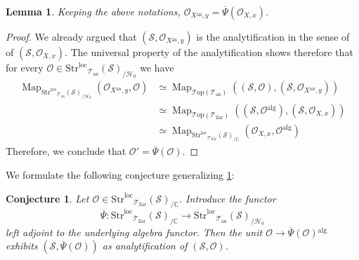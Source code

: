 \documentclass[12pt,a4paper,reqno]{amsart}
\theoremstyle{plain}
\newtheorem{lem}[thm]{Lemma}
\newtheorem{conj}[thm]{Conjecture}
\theoremstyle{definition}
\theoremstyle{remark}
\numberwithin{equation}{section}
\begin{document}
\begin{lem} \label{lem:Psi_computes_absolute_analytification}
	Keeping the above notations, ${\mathcal O}_{X{^\mathrm{an}}, y} = \overline{\Psi}({\mathcal O}_{X,x})$.
\end{lem}

\begin{proof}
	We already argued that $({\mathcal S}, {\mathcal O}_{X{^\mathrm{an}}, y})$ is the analytification in the sense of \cite{DAG-IX} of $({\mathcal S}, {\mathcal O}_{X,x})$.
	The universal property of the analytification shows therefore that for every ${\mathcal O} \in {\mathrm{Str}^\mathrm{loc}}_{{\mathcal T}_{\mathrm{an}}}({\mathcal S})_{/{\mathcal H}_0}$ we have
	\begin{align*}
	\operatorname{Map}_{{\mathrm{Str}^\mathrm{loc}}_{{\mathcal T}_{\mathrm{an}}}({\mathcal S})_{/{\mathcal H}_0}}({\mathcal O}_{X{^\mathrm{an}},y}, {\mathcal O}) & \simeq \operatorname{Map}_{{\mathcal T\mathrm{op}}({{\mathcal T}_{\mathrm{an}}})}(({\mathcal S}, {\mathcal O}), ({\mathcal S}, {\mathcal O}_{X{^\mathrm{an}},y}) ) \\
	& \simeq \operatorname{Map}_{{\mathcal T\mathrm{op}}({{\mathcal T}_{\mathrm{Zar}}})}(({\mathcal S}, {\mathcal O}{^\mathrm{alg}}), ({\mathcal S}, {\mathcal O}_{X,x})) \\
	& \simeq \operatorname{Map}_{{\mathrm{Str}^\mathrm{loc}}_{{\mathcal T}_{\mathrm{Zar}}}({\mathcal S})_{/\mathbb C}}({\mathcal O}_{X,x}, {\mathcal O}{^\mathrm{alg}} )
	\end{align*}
	Therefore, we conclude that ${\mathcal O}' = \overline{\Psi}({\mathcal O})$.
\end{proof}

We formulate the following conjecture generalizing \cref{lem:Psi_computes_absolute_analytification}:

\begin{conj}
	Let ${\mathcal O} \in {\mathrm{Str}^\mathrm{loc}}_{{\mathcal T}_{\mathrm{Zar}}}({\mathcal S})_{/\mathbb C}$.
	Introduce the functor
	\[ \overline{\Psi} \colon {\mathrm{Str}^\mathrm{loc}}_{{\mathcal T}_{\mathrm{Zar}}}({\mathcal S})_{/\mathbb C} \to {\mathrm{Str}^\mathrm{loc}}_{{\mathcal T}_{\mathrm{an}}}({\mathcal S})_{/{\mathcal H}_0} \]
	left adjoint to the underlying algebra functor.
	Then the unit ${\mathcal O} \to \overline{\Psi}({\mathcal O}){^\mathrm{alg}}$ exhibits $({\mathcal S}, \overline{\Psi}({\mathcal O}))$ as analytification of $({\mathcal S}, {\mathcal O})$.
\end{conj}
\end{document}

